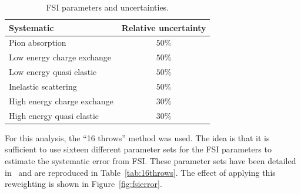 \begin{table}[ht]
  \center
  \begin{tabular}{lc}
    \toprule
    Systematic & Relative uncertainty \\
    \midrule
    Pion absorption             & $50\%$  \\
    Low energy charge exchange  & $50\%$  \\
    Low energy quasi elastic    & $50\%$  \\
    Inelastic scattering        & $50\%$  \\
    High energy charge exchange & $30\%$  \\
    High energy quasi elastic   & $30\%$  \\
    \bottomrule
  \end{tabular}
  \caption[FSI parameters and uncertainties]{\Gls{FSI} parameters and
    uncertainties.}
  \label{tab:fsiuncertainty}
\end{table}

For this analysis, the ``16 throws'' method was used. The idea is that
it is sufficient to use sixteen different parameter sets for the
\Gls{FSI} parameters to estimate the systematic error from
\Gls{FSI}. These parameter sets have been detailed in~\cite{TN108} and
are reproduced in Table~\ref{tab:16throws}. The effect of applying
this reweighting is shown in Figure~\ref{fig:fsierror}.

